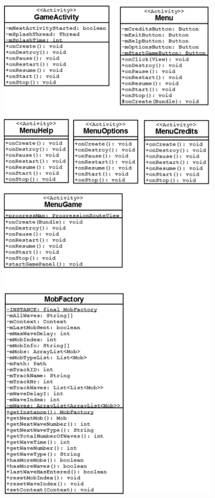 \begin{figure}[here]

\begin{center}

\includegraphics[scale=0.35]{pics/chapters/AppendixA/uml1}

\end{center}

\end{figure}

